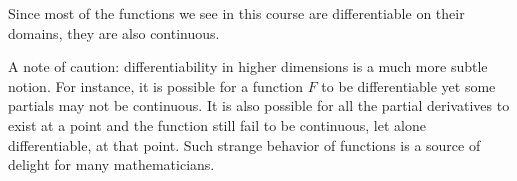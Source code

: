 \documentclass{ximera}
\begin{document}
Since most of the functions we see in this course are differentiable
on their domains, they are also continuous.

A note of caution: differentiability in higher dimensions is a much
more subtle notion.  For instance, it is possible for a function $F$
to be differentiable yet some partials may not be continuous. It is
also possible for all the partial derivatives to exist at a point and
the function still fail to be continuous, let alone differentiable, at
that point.  Such strange behavior of functions is a source of delight
for many mathematicians.
\end{document}
